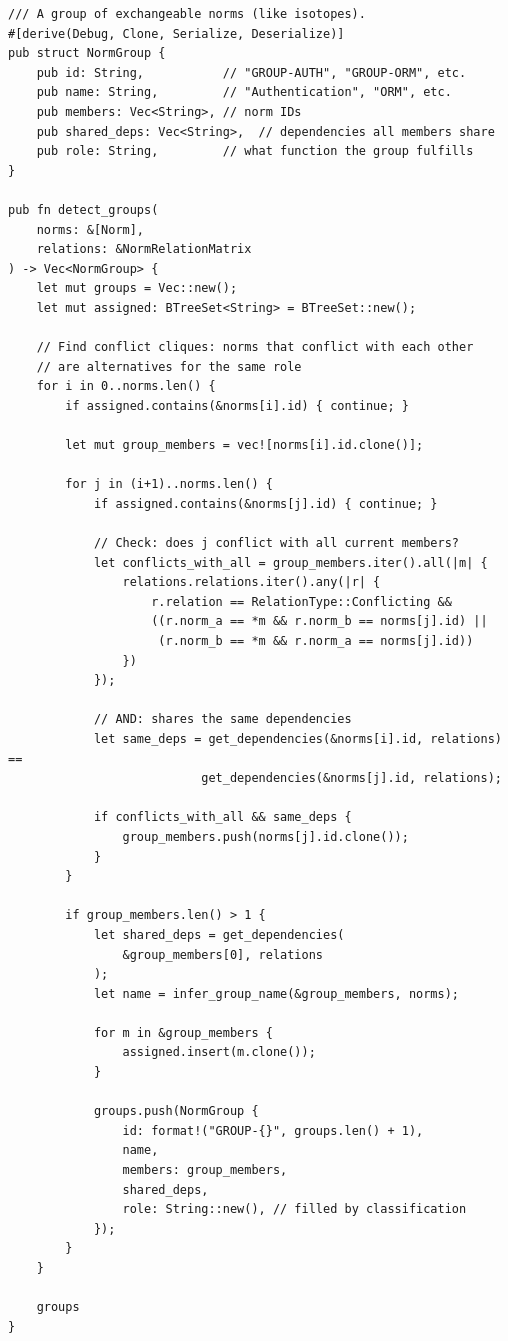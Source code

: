 \documentclass[11pt,a4paper]{article}
\begin{document}
\begin{lstlisting}[style=rust]
/// A group of exchangeable norms (like isotopes).
#[derive(Debug, Clone, Serialize, Deserialize)]
pub struct NormGroup {
    pub id: String,           // "GROUP-AUTH", "GROUP-ORM", etc.
    pub name: String,         // "Authentication", "ORM", etc.
    pub members: Vec<String>, // norm IDs
    pub shared_deps: Vec<String>,  // dependencies all members share
    pub role: String,         // what function the group fulfills
}

pub fn detect_groups(
    norms: &[Norm],
    relations: &NormRelationMatrix
) -> Vec<NormGroup> {
    let mut groups = Vec::new();
    let mut assigned: BTreeSet<String> = BTreeSet::new();
    
    // Find conflict cliques: norms that conflict with each other
    // are alternatives for the same role
    for i in 0..norms.len() {
        if assigned.contains(&norms[i].id) { continue; }
        
        let mut group_members = vec![norms[i].id.clone()];
        
        for j in (i+1)..norms.len() {
            if assigned.contains(&norms[j].id) { continue; }
            
            // Check: does j conflict with all current members?
            let conflicts_with_all = group_members.iter().all(|m| {
                relations.relations.iter().any(|r| {
                    r.relation == RelationType::Conflicting &&
                    ((r.norm_a == *m && r.norm_b == norms[j].id) ||
                     (r.norm_b == *m && r.norm_a == norms[j].id))
                })
            });
            
            // AND: shares the same dependencies
            let same_deps = get_dependencies(&norms[i].id, relations) ==
                           get_dependencies(&norms[j].id, relations);
            
            if conflicts_with_all && same_deps {
                group_members.push(norms[j].id.clone());
            }
        }
        
        if group_members.len() > 1 {
            let shared_deps = get_dependencies(
                &group_members[0], relations
            );
            let name = infer_group_name(&group_members, norms);
            
            for m in &group_members {
                assigned.insert(m.clone());
            }
            
            groups.push(NormGroup {
                id: format!("GROUP-{}", groups.len() + 1),
                name,
                members: group_members,
                shared_deps,
                role: String::new(), // filled by classification
            });
        }
    }
    
    groups
}
\end{lstlisting}
\end{document}
